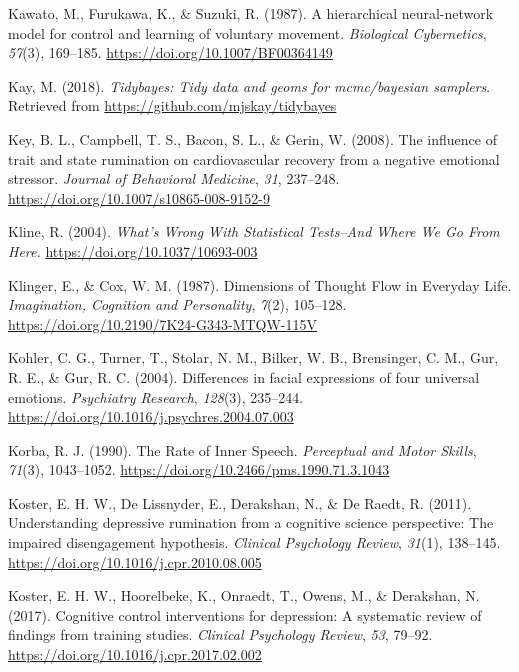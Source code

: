 \documentclass[a4paper,12pt,twoside,onecolumn,openright,final,oldfontcommands]{memoir}
\begin{document}
\leavevmode\hypertarget{ref-kawato_hierarchical_1987}{}%
Kawato, M., Furukawa, K., \& Suzuki, R. (1987). A hierarchical neural-network model for control and learning of voluntary movement. \emph{Biological Cybernetics}, \emph{57}(3), 169--185. \url{https://doi.org/10.1007/BF00364149}

\leavevmode\hypertarget{ref-R-tidybayes}{}%
Kay, M. (2018). \emph{Tidybayes: Tidy data and geoms for mcmc/bayesian samplers}. Retrieved from \url{https://github.com/mjskay/tidybayes}

\leavevmode\hypertarget{ref-Key2008}{}%
Key, B. L., Campbell, T. S., Bacon, S. L., \& Gerin, W. (2008). The influence of trait and state rumination on cardiovascular recovery from a negative emotional stressor. \emph{Journal of Behavioral Medicine}, \emph{31}, 237--248. \url{https://doi.org/10.1007/s10865-008-9152-9}

\leavevmode\hypertarget{ref-Kline2004}{}%
Kline, R. (2004). \emph{What's Wrong With Statistical Tests--And Where We Go From Here.} \url{https://doi.org/10.1037/10693-003}

\leavevmode\hypertarget{ref-klinger_dimensions_1987}{}%
Klinger, E., \& Cox, W. M. (1987). Dimensions of Thought Flow in Everyday Life. \emph{Imagination, Cognition and Personality}, \emph{7}(2), 105--128. \url{https://doi.org/10.2190/7K24-G343-MTQW-115V}

\leavevmode\hypertarget{ref-kohler_differences_2004}{}%
Kohler, C. G., Turner, T., Stolar, N. M., Bilker, W. B., Brensinger, C. M., Gur, R. E., \& Gur, R. C. (2004). Differences in facial expressions of four universal emotions. \emph{Psychiatry Research}, \emph{128}(3), 235--244. \url{https://doi.org/10.1016/j.psychres.2004.07.003}

\leavevmode\hypertarget{ref-korba_rate_1990}{}%
Korba, R. J. (1990). The Rate of Inner Speech. \emph{Perceptual and Motor Skills}, \emph{71}(3), 1043--1052. \url{https://doi.org/10.2466/pms.1990.71.3.1043}

\leavevmode\hypertarget{ref-Koster2011}{}%
Koster, E. H. W., De Lissnyder, E., Derakshan, N., \& De Raedt, R. (2011). Understanding depressive rumination from a cognitive science perspective: The impaired disengagement hypothesis. \emph{Clinical Psychology Review}, \emph{31}(1), 138--145. \url{https://doi.org/10.1016/j.cpr.2010.08.005}

\leavevmode\hypertarget{ref-koster_cognitive_2017}{}%
Koster, E. H. W., Hoorelbeke, K., Onraedt, T., Owens, M., \& Derakshan, N. (2017). Cognitive control interventions for depression: A systematic review of findings from training studies. \emph{Clinical Psychology Review}, \emph{53}, 79--92. \url{https://doi.org/10.1016/j.cpr.2017.02.002}
\end{document}
